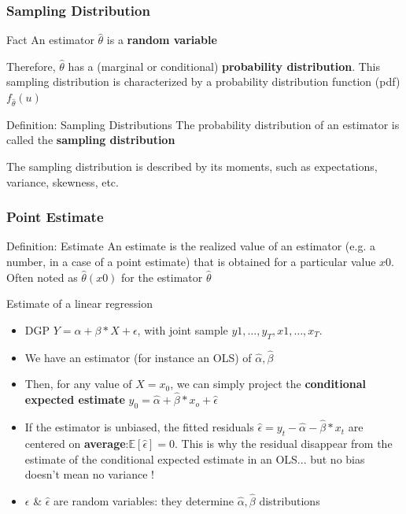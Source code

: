 \documentclass{beamer}
\begin{document}
\begin{frame}
  \frametitle{Sampling Distribution}

  \begin{block}{Fact}
    An estimator $\hat{\theta}$ is a \textbf{random variable}
  \end{block}
  Therefore, $\hat{\theta}$ has a (marginal or conditional) \textbf{probability distribution}. This sampling distribution is characterized by a probability distribution function (pdf) $f_{\hat{\theta}}(u)$

  \begin{block}{Definition: Sampling Distributions}
    The probability distribution of an estimator is called the \textbf{sampling distribution}
  \end{block}
  The sampling distribution is described by its moments, such as expectations, variance, skewness, etc.
  \end{frame}


  
  \begin{frame}
    \frametitle{Point Estimate}
    \begin{block}{Definition: Estimate}
      An estimate is the realized value of an estimator (e.g. a number, in a case of a point estimate) that is obtained for a particular value $x0$. Often noted as $\hat{\theta}(x0)$ for the estimator $\hat{\theta}$
    \end{block}

    \begin{exampleblock}{Estimate of a linear regression}
      \begin{itemize}
      \item DGP $Y = \alpha + \beta*X + \epsilon$, with joint sample ${y1, \dots, y_T}, {x1, \dots, x_T}$.\\
      \item We have an estimator (for instance an OLS) of $\hat{\alpha}, \hat{\beta}$
      \item Then, for any value of $X=x_0$, we can simply project the \textbf{conditional expected estimate} $y_0 = \hat{\alpha} + \hat{\beta}*x_o + \hat{\epsilon}$
      \item If the estimator is unbiased, the fitted residuals $\hat{\epsilon} = y_t - \hat{\alpha} - \hat{\beta}*x_t$ are centered on \textbf{average}:$\mathbb{E}\left[\hat{\epsilon}\right]=0$. This is why the residual disappear from the estimate of the conditional expected estimate in an OLS... but no bias doesn't mean no variance !
      \item $\epsilon$ \& $\hat{\epsilon}$ are random variables: they determine $\hat{\alpha}, \hat{\beta}$ distributions
      \end{itemize}
    \end{exampleblock}    
  \end{frame}
\end{document}
